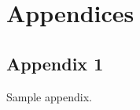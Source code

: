 \appendix
\captionsetup[table]{list=no}
\captionsetup[figure]{list=no}

\chapter{Appendices}

\section{Appendix 1}

Sample appendix.
